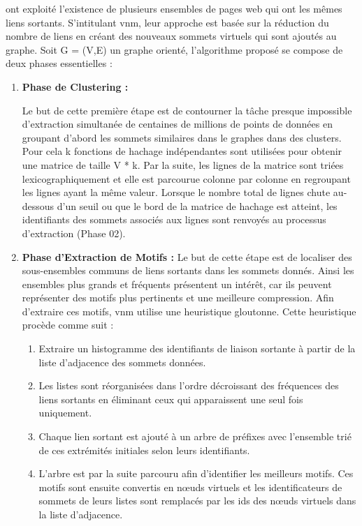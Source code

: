 				\citep{buehrer2008scalable} ont exploité l'existence de plusieurs ensembles de pages web qui ont les mêmes liens sortants. S'intitulant  
				\gls{vnm}, leur approche est basée sur la réduction du nombre de liens en créant des nouveaux sommets virtuels qui sont ajoutés au graphe. Soit G = (V,E) un graphe orienté, l'algorithme proposé se compose de deux phases essentielles :
				\begin{enumerate}
				
				
					\item \textbf{Phase de Clustering :}
					
					Le but de cette première étape est de contourner la tâche presque impossible d'extraction simultanée de centaines de millions de points de données en groupant d'abord les sommets similaires dans le graphes dans des clusters. 
				Pour cela k fonctions de hachage indépendantes sont utilisées pour obtenir une matrice de taille V * k. Par la suite, les lignes de la matrice  sont triées lexicographiquement
				et elle est parcourue colonne par colonne en regroupant les lignes ayant la même valeur. Lorsque le nombre total de lignes chute au-dessous d'un seuil ou que le bord de la matrice de hachage est atteint, les identifiants des sommets associés aux lignes sont renvoyés au processus d'extraction (Phase 02). 
					
					\item \textbf{Phase d'Extraction de Motifs :}				Le but de cette étape est de localiser des sous-ensembles communs de liens sortants dans les sommets donnés. 
				Ainsi les ensembles plus grands et fréquents présentent un intérêt, car ils peuvent représenter des motifs plus pertinents et une meilleure compression. 
				Afin d'extraire ces motifs, \gls{vnm}  utilise une heuristique gloutonne. Cette heuristique procède comme suit :
				\begin{enumerate}
				\item Extraire un histogramme des identifiants de liaison sortante à partir de la liste d'adjacence des sommets données.
				\item Les listes sont réorganisées dans l'ordre décroissant des fréquences des liens sortants en éliminant ceux qui apparaissent une seul fois uniquement.
				\item Chaque lien sortant est ajouté à un arbre de préfixes avec l'ensemble trié de ces extrémités initiales selon leurs identifiants. 
				\item L'arbre est par la suite parcouru afin d'identifier les meilleurs motifs. Ces motifs sont ensuite convertis en nœuds virtuels et les identificateurs de sommets de leurs listes sont remplacés par les ids des nœuds virtuels dans la liste d'adjacence.
				\end{enumerate}
				 
				\end{enumerate}
				
